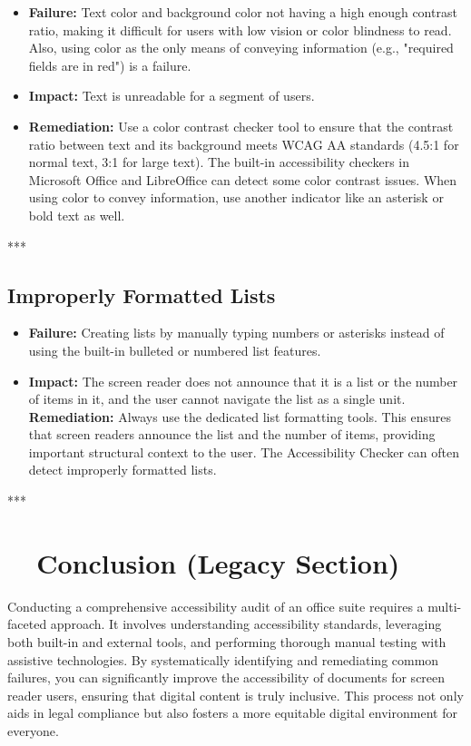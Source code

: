 \begin{itemize}
	\item \textbf{Failure:} Text color and background color not having a high enough contrast ratio, making it difficult for users with low vision or color blindness to read. Also, using color as the only means of conveying information (e.g., "required fields are in red") is a failure.
	\item \textbf{Impact:} Text is unreadable for a segment of users.
	\item \textbf{Remediation:} Use a color contrast checker tool to ensure that the contrast ratio between text and its background meets \gls{WCAG} AA standards (4.5:1 for normal text, 3:1 for large text). The built-in accessibility checkers in Microsoft Office and LibreOffice can detect some color contrast issues. When using color to convey information, use another indicator like an asterisk or bold text as well.
\end{itemize}

***

\subsection{Improperly Formatted Lists}
\label{sub:improperly-formatted-lists}

\begin{itemize}
	\item \textbf{Failure:} Creating lists by manually typing numbers or asterisks instead of using the built-in bulleted or numbered list features.
	\item \textbf{Impact:} The screen reader does not announce that it is a list or the number of items in it, and the user cannot navigate the list as a single unit.
	      \textbf{Remediation:} Always use the dedicated list formatting tools. This ensures that screen readers announce the list and the number of items, providing important structural context to the user. The Accessibility Checker can often detect improperly formatted lists.
\end{itemize}

***

\section{~~Conclusion (Legacy Section)}
\label{ch20:sec:conclusion-legacy}

Conducting a comprehensive accessibility audit of an office suite requires a multi-faceted approach. It involves understanding accessibility standards, leveraging both built-in and external tools, and performing thorough manual testing with assistive technologies. By systematically identifying and remediating common failures, you can significantly improve the accessibility of documents for screen reader users, ensuring that digital content is truly inclusive. This process not only aids in legal compliance but also fosters a more equitable digital environment for everyone.